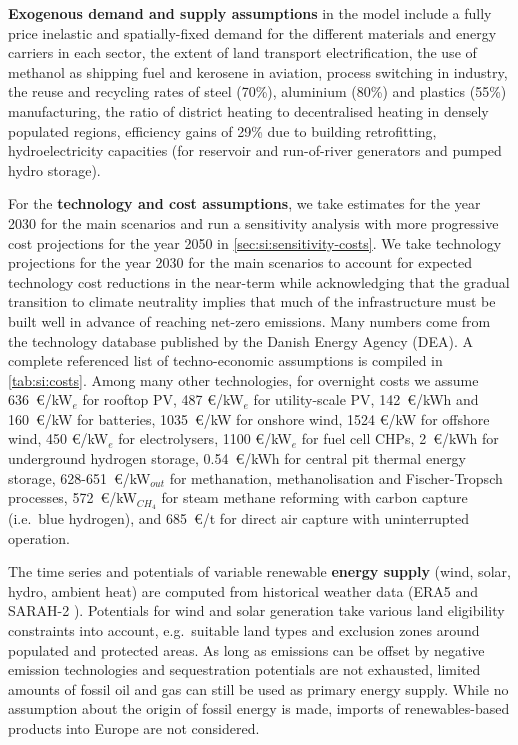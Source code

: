 \textbf{Exogenous demand and supply assumptions} in the model include a fully
price inelastic and spatially-fixed demand for the different materials and
energy carriers in each sector, the extent of land transport electrification,
the use of methanol as shipping fuel and kerosene in aviation, process switching
in industry, the reuse and recycling rates of steel (70\%), aluminium (80\%) and
plastics (55\%) manufacturing, the ratio of district heating to decentralised
heating in densely populated regions, efficiency gains of 29\% due to building
retrofitting, hydroelectricity capacities (for reservoir and run-of-river
generators and pumped hydro storage).

For the \textbf{technology and cost assumptions}, we take estimates for the year
2030 for the main scenarios and run a sensitivity analysis with more progressive
cost projections for the year 2050 in \cref{sec:si:sensitivity-costs}. We take
technology projections for the year 2030 for the main scenarios to account for
expected technology cost reductions in the near-term while acknowledging that
the gradual transition to climate neutrality implies that much of the
infrastructure must be built well in advance of reaching net-zero emissions.
Many numbers come from the technology database published by the Danish Energy
Agency (DEA). A complete referenced list of techno-economic
assumptions is compiled in \cref{tab:si:costs}. Among many other technologies,
for overnight costs we assume 636~\euro/kW$_e$ for rooftop PV, 487 \euro/kW$_e$
for utility-scale PV, 142~\euro/kWh and 160~\euro/kW for batteries,
1035~\euro/kW for onshore wind, 1524 \euro/kW for offshore wind, 450
\euro/kW$_e$ for electrolysers, 1100 \euro/kW$_e$ for fuel cell CHPs,
2~\euro/kWh for underground hydrogen storage, 0.54~\euro/kWh for central pit
thermal energy storage, 628-651~\euro/kW$_{out}$ for methanation,
methanolisation and Fischer-Tropsch processes, 572~\euro/kW$_{CH_4}$ for steam
methane reforming with carbon capture (i.e.~blue hydrogen), and 685~\euro/t for
direct air capture with uninterrupted operation.

The time series and potentials of variable renewable \textbf{energy supply}
(wind, solar, hydro, ambient heat) are computed from historical weather data
(ERA5 \cite{ecmwf} and SARAH-2 \cite{SARAH}). Potentials for wind and solar
generation take various land eligibility constraints into account, e.g.~suitable
land types and exclusion zones around populated and protected areas. As long as
emissions can be offset by negative emission technologies and sequestration
potentials are not exhausted, limited amounts of fossil oil and gas can still be
used as primary energy supply. While no assumption about the origin of fossil
energy is made, imports of renewables-based products into Europe are not
considered.

